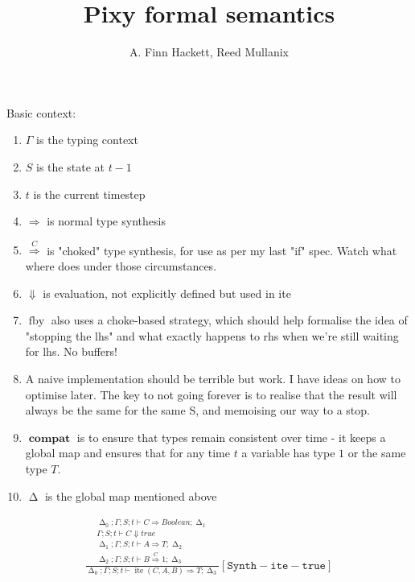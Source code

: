 \documentclass{scrartcl}
\DeclareMathOperator{\fby}{fby}
\DeclareMathOperator{\ite}{ite}
\DeclareMathOperator{\compat}{\mathbf{compat}}
\DeclareMathOperator{\gtypes}{\Delta}
\begin{document}
    \title{Pixy formal semantics}
    \author{A. Finn Hackett, Reed Mullanix}
    \maketitle
    
    Basic context:
    \begin{enumerate}
        \item $\Gamma$ is the typing context
        \item $S$ is the state at $t-1$
        \item $t$ is the current timestep
        \item $\Rightarrow$ is normal type synthesis
        \item $\overset{C}{\Rightarrow}$ is "choked" type synthesis, for use as per my last "if" spec. Watch what where does under those circumstances.
        \item $\Downarrow$ is evaluation, not explicitly defined but used in ite
        \item $\fby$ also uses a choke-based strategy, which should help formalise the idea of "stopping the lhs" and what exactly happens to rhs when we're still
        waiting for lhs. No buffers!
        \item A naive implementation should be terrible but work. I have ideas on how to optimise later. The key to not going forever is to realise that the result will always be the same for the same S, and memoising our way to a stop.
        \item $\compat$ is to ensure that types remain consistent over time - it keeps a global map and ensures that for any time $t$ a variable has type $1$ or the same type $T$.
        \item $\gtypes$ is the global map mentioned above
    \end{enumerate}
    
    \begin{align*}
    \frac{
        \begin{matrix}
        \gtypes_0; \Gamma; S; t \vdash C \Rightarrow Boolean; \gtypes_1 \\
        \Gamma; S; t \vdash C \Downarrow true \\
        \gtypes_1; \Gamma; S; t \vdash A \Rightarrow T; \gtypes_2 \\
        \gtypes_2; \Gamma; S; t \vdash B \overset{C}{\Rightarrow} 1; \gtypes_3
        \end{matrix}
    }{
        \gtypes_0; \Gamma; S; t \vdash \ite(C,A,B) \Rightarrow T; \gtypes_3
    }[\mathtt{Synth-ite-true}]
    \end{align*}
    
\end{document}
